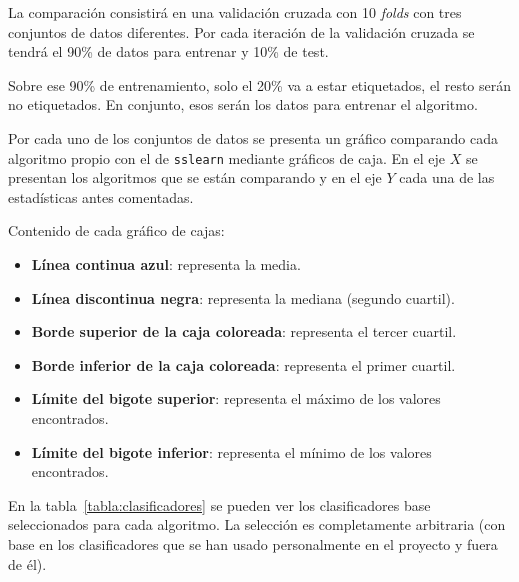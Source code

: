 La comparación consistirá en una validación cruzada con 10 \textit{folds} con
tres conjuntos de datos diferentes. Por cada iteración de la validación cruzada
se tendrá el 90\% de datos para entrenar y 10\% de test.

Sobre ese 90\% de entrenamiento, solo el 20\% va a estar etiquetados, el resto
serán no etiquetados. En conjunto, esos serán los datos para entrenar el
algoritmo.

Por cada uno de los conjuntos de datos se presenta un gráfico comparando cada
algoritmo propio con el de \texttt{sslearn} mediante gráficos de caja. En el eje
$X$ se presentan los algoritmos que se están comparando y en el eje $Y$ cada una de
las estadísticas antes comentadas.

Contenido de cada gráfico de cajas:
\vspace{-0.4cm}
\begin{itemize}
    \item \textbf{Línea continua azul}: representa la media.
    \item \textbf{Línea discontinua negra}: representa la mediana (segundo
    cuartil).
    \item \textbf{Borde superior de la caja coloreada}: representa el tercer cuartil.
    \item \textbf{Borde inferior de la caja coloreada}: representa el primer cuartil.
    \item \textbf{Límite del bigote superior}: representa el máximo de los valores
    encontrados.
    \item \textbf{Límite del bigote inferior}: representa el mínimo de los valores
    encontrados.
\end{itemize}

En la tabla~\ref{tabla:clasificadores} se pueden ver los clasificadores base
seleccionados para cada algoritmo. La selección es completamente arbitraria (con
base en los clasificadores que se han usado personalmente en el proyecto y fuera
de él).

\begin{table}[H]
    \centering
\caption{Clasificadores base}
\label{tabla:clasificadores}
\end{table}


